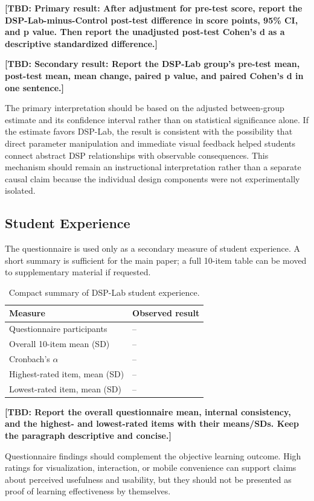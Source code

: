 \documentclass[11pt,a4paper]{article}
\newcommand{\tbd}[1]{\textbf{[TBD: #1]}}
\begin{document}
\tbd{Primary result: After adjustment for pre-test score, report the DSP-Lab-minus-Control post-test difference in score points, 95\% CI, and p value. Then report the unadjusted post-test Cohen's d as a descriptive standardized difference.}

\tbd{Secondary result: Report the DSP-Lab group's pre-test mean, post-test mean, mean change, paired p value, and paired Cohen's d in one sentence.}

The primary interpretation should be based on the adjusted between-group estimate and its confidence interval rather than on statistical significance alone. If the estimate favors DSP-Lab, the result is consistent with the possibility that direct parameter manipulation and immediate visual feedback helped students connect abstract DSP relationships with observable consequences. This mechanism should remain an instructional interpretation rather than a separate causal claim because the individual design components were not experimentally isolated.

\subsection{Student Experience}
The questionnaire is used only as a secondary measure of student experience. A short summary is sufficient for the main paper; a full 10-item table can be moved to supplementary material if requested.

\begin{table}[htbp]
\centering
\caption{Compact summary of DSP-Lab student experience.}
\label{tab:questionnaire-summary}
\begin{tabular}{p{}p{}}
\toprule
Measure & Observed result \\
\midrule
Questionnaire participants & -- \\
Overall 10-item mean (SD) & -- \\
Cronbach's $\alpha$ & -- \\
Highest-rated item, mean (SD) & -- \\
Lowest-rated item, mean (SD) & -- \\
\bottomrule
\end{tabular}
\end{table}

\tbd{Report the overall questionnaire mean, internal consistency, and the highest- and lowest-rated items with their means/SDs. Keep the paragraph descriptive and concise.}

Questionnaire findings should complement the objective learning outcome. High ratings for visualization, interaction, or mobile convenience can support claims about perceived usefulness and usability, but they should not be presented as proof of learning effectiveness by themselves.
\end{document}

